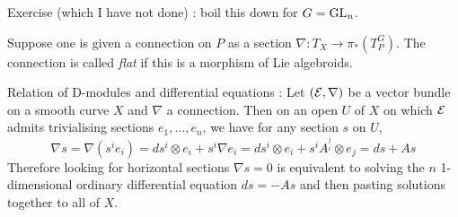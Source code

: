 \documentclass[./main.tex]{subfiles}
\begin{document}
Exercise (which I have not done) : 
boil this down for $G = \operatorname{GL}_n$.

Suppose one is given a connection on $P$ as
a section $\nabla : T_X \to \pi_*(T_P^G)$.
The connection is called \emph{flat} if this is a morphism of Lie algebroids.

Relation of D-modules and differential equations : 
Let $(\mathcal{E} , \nabla)$ be a vector bundle on a smooth curve $X$ and $\nabla$
a connection.
Then on an open $U$ of $X$ on which $\mathcal{E}$ admits trivialising sections
$e_1 , \dots , e_n$, we have for any section $s$ on $U$,
\[
  \nabla s = \nabla(s^i e_i) = ds^i \otimes e_i + s^i \nabla e_i
  = ds^i \otimes e_i + s^i A^{_i^j} \otimes e_j
  = ds + As
\]
Therefore looking for horizontal sections $\nabla s = 0$
is equivalent to solving the $n$ 1-dimensional ordinary differential equation
$d s = - A s$ and then pasting solutions together to all of $X$.
\end{document}

